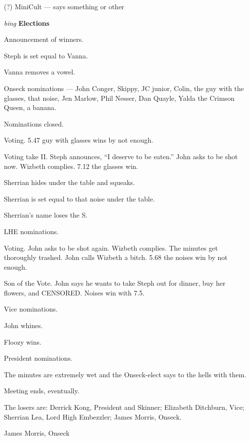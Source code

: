 (?) MiniCult --- says something or other

\vspace{.15in}
{\em bing\/} {\bf Elections\/}

Announcement of winners.

Steph is set equal to Vanna.

Vanna removes a vowel.

Onseck nominations --- John Conger, Skippy, JC junior, Colin, the guy
with the glasses, that noise, Jen Marlow, Phil Nesser, Dan Quayle,
Yalda the Crimson Queen, a banana.

Nominations closed.

Voting.  5.47 guy with glasses wins by not enough.

Voting take II.  Steph announces, ``I deserve to be eaten.''  John asks
to be shot now.  Wizbeth complies.  7.12 the glasses win.

Sherrian hides under the table and squeaks.

Sherrian is set equal to that noise under the table.

Sherrian's name loses the S.

LHE nominations.

Voting.  John asks to be shot again.  Wizbeth complies.  The minutes get
thoroughly trashed.  John calls Wizbeth a bitch.  5.68 the noises win
by not enough.

Son of the Vote.  John says he wants to take Steph out for dinner, buy
her flowers, and CENSORED.  Noises win with 7.5.

Vice nominations.

John whines.

Floozy wins.

President nominations.

The minutes are extremely wet and the Onseck-elect says to the hells
with them.

Meeting ends, eventually.
\vspace{0.15in}

The losers are:  Derrick Kong, President and Skinner; Elizabeth
Ditchburn, Vice; Sherrian Lea, Lord High Embezzler; James Morris,
Onseck.
\vspace{0.15in}

James Morris, Onseck


